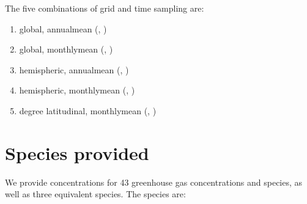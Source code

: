 \documentclass[letterpaper,10pt,english]{jupyterBook}
\begin{document}
\sphinxAtStartPar
The five combinations of grid and time sampling are:
\begin{enumerate}
%
\item {}
\sphinxAtStartPar
global\sphinxhyphen{}, annual\sphinxhyphen{}mean (, )

\item {}
\sphinxAtStartPar
global\sphinxhyphen{}, monthly\sphinxhyphen{}mean (, )

\item {}
\sphinxAtStartPar
hemispheric\sphinxhyphen{}, annual\sphinxhyphen{}mean (, )

\item {}
\sphinxAtStartPar
hemispheric\sphinxhyphen{}, monthly\sphinxhyphen{}mean (, )

\item {}
\sphinxhyphen{}degree latitudinal, monthly\sphinxhyphen{}mean (, )

\end{enumerate}


\section{Species provided}
\label{\detokenize{user-guide-historical:species-provided}}
\sphinxAtStartPar
We provide concentrations for 43 greenhouse gas concentrations and species,
as well as three equivalent species.
The species are:
\end{document}
